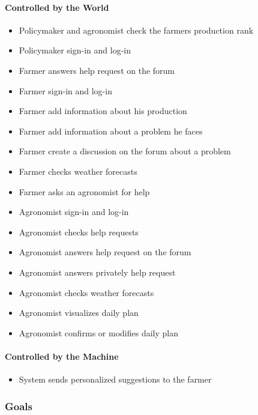 \paragraph{Controlled by the World}
\begin{itemize}
    \item Policymaker and agronomist check the farmers production rank
    \item Policymaker sign-in and log-in
    \item Farmer answers help request on the forum
    \item Farmer sign-in and log-in 
    \item Farmer add information about his production
    \item Farmer add information about a problem he faces
    \item Farmer create a discussion on the forum about a problem
    \item Farmer checks weather forecasts
    \item Farmer asks an agronomist for help
    \item Agronomist sign-in and log-in
    \item Agronomist checks help requests
    \item Agronomist answers help request on the forum
    \item Agronomist answers privately help request
    \item Agronomist checks weather forecasts
    \item Agronomist visualizes daily plan
    \item Agronomist confirms or modifies daily plan
\end{itemize}

\paragraph{Controlled by the Machine}
\begin{itemize}
    \item System sends personalized suggestions to the farmer
\end{itemize}

\subsubsection{Goals}

